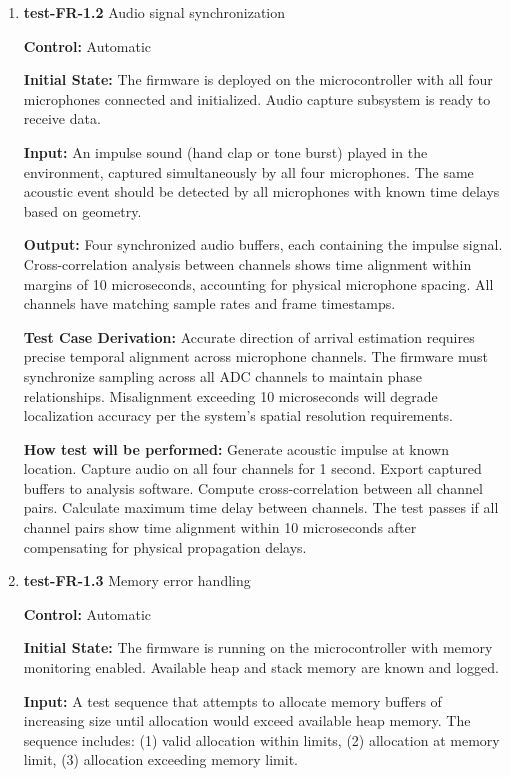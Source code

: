 \documentclass[12pt, titlepage]{article}
\begin{document}
\begin{enumerate}
\item{\textbf{test-FR-1.2} Audio signal synchronization\\}

\textbf{Control:} Automatic
					
\textbf{Initial State:} 
The firmware is deployed on the microcontroller with all four microphones 
connected and initialized. Audio capture subsystem is ready to receive data.
					
\textbf{Input:}
An impulse sound (hand clap or tone burst) played in the environment, captured 
simultaneously by all four microphones. The same acoustic event should be 
detected by all microphones with known time delays based on geometry.
					
\textbf{Output:}
Four synchronized audio buffers, each containing the impulse signal. Cross-correlation 
analysis between channels shows time alignment within margins of 10 microseconds, 
accounting for physical microphone spacing. All channels have matching sample 
rates and frame timestamps.

\textbf{Test Case Derivation:} 
Accurate direction of arrival estimation requires precise temporal alignment 
across microphone channels. The firmware must synchronize sampling across all 
ADC channels to maintain phase relationships. Misalignment exceeding 10 
microseconds will degrade localization accuracy per the system's spatial 
resolution requirements.
					
\textbf{How test will be performed:}
Generate acoustic impulse at known location. Capture audio on all four channels 
for 1 second. Export captured buffers to analysis software. Compute cross-correlation 
between all channel pairs. Calculate maximum time delay between channels. The 
test passes if all channel pairs show time alignment within 10 microseconds after 
compensating for physical propagation delays.

\item{\textbf{test-FR-1.3} Memory error handling\\}

\textbf{Control:} Automatic
					
\textbf{Initial State:} 
The firmware is running on the microcontroller with memory monitoring enabled. 
Available heap and stack memory are known and logged.
					
\textbf{Input:}
A test sequence that attempts to allocate memory buffers of increasing size 
until allocation would exceed available heap memory. The sequence includes: 
(1) valid allocation within limits, (2) allocation at memory limit, (3) 
allocation exceeding memory limit.
					

\end{enumerate}
\end{document}
